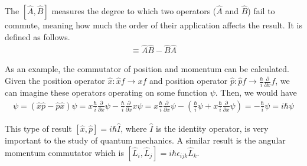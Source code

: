 \begin{defn}{1}
	The  $[\hat{A},\hat{B}]$ measures the degree to which two operators ($\hat{A}$ and $\hat{B}$) fail to commute, meaning how much the order of their application affects the result. It is defined as follows.
\begin{align}
[\hat{A},\hat{B}] \equiv \hat{A}\hat{B} - \hat{B}\hat{A}
\end{align}
\end{defn}

As an example, the commutator of position and momentum can be calculated. Given the position operator $\hat{x}: \hat{x}f \rightarrow xf$ and position operator $\hat{p}: \hat{p}f \rightarrow \frac{\hbar}{i}\frac{\partial}{\partial x} f$, we can imagine these operators operating on some function $\psi$. Then, we would have
\begin{align}
[\hat{x},\hat{p}]\psi = (\hat{x}\hat{p} - \hat{p}\hat{x})\psi = x\frac{\hbar}{i}\frac{\partial}{\partial x}\psi - \frac{\hbar}{i}\frac{\partial}{\partial x}x\psi = x\frac{\hbar}{i}\frac{\partial}{\partial x}\psi - \left(\frac{\hbar}{i}\psi + x\frac{\hbar}{i}\frac{\partial}{\partial x}\psi\right) = -\frac{\hbar}{i}\psi = i\hbar\psi
\end{align}

This type of result $[\hat{x},\hat{p}] = i\hbar\hat{I}$, where $\hat{I}$ is the identity operator, is very important to the study of quantum mechanics. A similar result is the angular momentum commutator which is $[\hat{L}_i,\hat{L}_j] = i\hbar\epsilon_{ijk}\hat{L}_k$.




